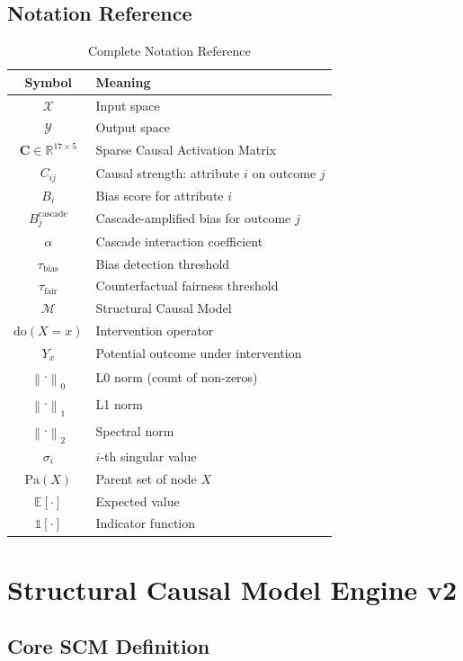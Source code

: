 \documentclass[12pt,a4paper]{report}
\theoremstyle{plain}
\theoremstyle{definition}
\theoremstyle{remark}
\newcommand{\inputspace}{\mathcal{X}}
\newcommand{\outputspace}{\mathcal{Y}}
\newcommand{\scmmodel}{\mathcal{M}}
\newcommand{\scam}{\mathbf{C}}
\newcommand{\casc}{^{\text{cascade}}}
\newcommand{\taubias}{\tau_{\text{bias}}}
\newcommand{\taufair}{\tau_{\text{fair}}}
\newcommand{\norm}[1]{\left\|#1\right\|}
\newcommand{\E}{\mathbb{E}}
\newcommand{\R}{\mathbb{R}}
\newcommand{\ind}{\mathbb{1}}
\newcommand{\Pa}{\text{Pa}}
\newcommand{\doop}{\text{do}}
\begin{document}
\section{Notation Reference}

\begin{table}[htbp]
\centering
\caption{Complete Notation Reference}
\begin{tabular}{cl}
\toprule
\textbf{Symbol} & \textbf{Meaning} \\
\midrule
$\inputspace$ & Input space \\
$\outputspace$ & Output space \\
$\scam \in \R^{17 \times 5}$ & Sparse Causal Activation Matrix \\
$C_{ij}$ & Causal strength: attribute $i$ on outcome $j$ \\
$B_i$ & Bias score for attribute $i$ \\
$B_j\casc$ & Cascade-amplified bias for outcome $j$ \\
$\alpha$ & Cascade interaction coefficient \\
$\taubias$ & Bias detection threshold \\
$\taufair$ & Counterfactual fairness threshold \\
$\scmmodel$ & Structural Causal Model \\
$\doop(X = x)$ & Intervention operator \\
$Y_x$ & Potential outcome under intervention \\
$\norm{\cdot}_0$ & L0 norm (count of non-zeros) \\
$\norm{\cdot}_1$ & L1 norm \\
$\norm{\cdot}_2$ & Spectral norm \\
$\sigma_i$ & $i$-th singular value \\
$\Pa(X)$ & Parent set of node $X$ \\
$\E[\cdot]$ & Expected value \\
$\ind[\cdot]$ & Indicator function \\
\bottomrule
\end{tabular}
\end{table}

\chapter{Structural Causal Model Engine v2}
\label{ch:scm}

\section{Core SCM Definition}
\end{document}
